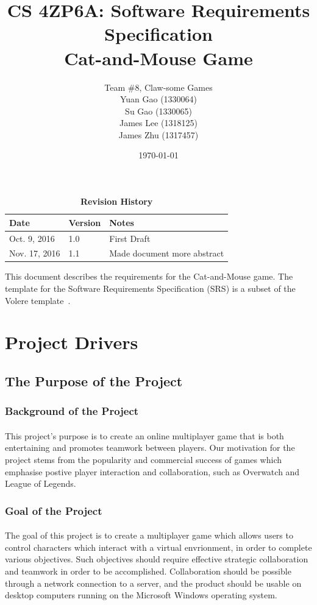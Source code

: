 \documentclass[12pt, titlepage]{article}
\title{CS 4ZP6A: Software Requirements Specification\\Cat-and-Mouse Game}
\author{Team \#8, Claw-some Games
		\\ Yuan Gao (1330064)
		\\ Su Gao (1330065)
		\\ James Lee (1318125)
		\\ James Zhu (1317457) 
}
\date{\today}
\begin{document}
\maketitle
{}
\tableofcontents
\listoftables
\listoffigures
\newcommand{\printBusinessEvent}{
    \stepcounter{BusinessEventList}
    \arabic{BusinessEventList}.
}

\begin{table}[bp]
\caption{\bf Revision History}
\begin{tabularx}{\textwidth}{p{3cm}p{2cm}X}
\toprule {\bf Date} & {\bf Version} & {\bf Notes}\\
\midrule
Oct. 9, 2016 & 1.0 & First Draft\\
Nov. 17, 2016 & 1.1 & Made document more abstract\\
\bottomrule
\end{tabularx}
\end{table}
\newpage
{}
This document describes the requirements for the Cat-and-Mouse game. The template for the Software
Requirements Specification (SRS) is a subset of the Volere
template~\citep{RobertsonAndRobertson2012}. 
\section{Project Drivers}
\subsection{The Purpose of the Project}
\subsubsection{Background of the Project}
\paragraph{}This project's purpose is to create an online multiplayer game that is both entertaining and promotes teamwork between players. Our motivation for the project stems from the popularity and commercial success of games which emphasise postive player interaction and collaboration, such as Overwatch and League of Legends.
\subsubsection{Goal of the Project}
\paragraph{}The goal of this project is to create a  multiplayer game which allows users to control characters which interact with a virtual envrionment, in order to complete various objectives. Such objectives should require effective strategic collaboration and teamwork in order to be accomplished.  Collaboration should be possible through a network connection to a server, and the product should be usable on desktop computers running on the Microsoft Windows operating system.
\end{document}
